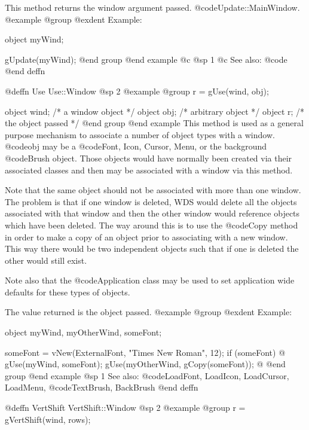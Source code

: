 This method returns the window argument passed.
@code{Update::MainWindow}.
@example
@group
@exdent Example:

object  myWind;

gUpdate(myWind);
@end group
@end example
@c @sp 1
@c See also:  @code{}
@end deffn









@deffn {Use} Use::Window
@sp 2
@example
@group
r = gUse(wind, obj);

object  wind;   /*  a window object     */
object  obj;    /*  arbitrary object    */
object  r;      /*  the object passed   */
@end group
@end example
This method is used as a general purpose mechanism to associate a
number of object types with a window.  @code{obj} may be a @code{Font,
Icon, Cursor, Menu,} or the background @code{Brush} object.  Those
objects would have normally been created via their associated classes
and then may be associated with a window via this method.

Note that the same object should not be associated with more than one
window.  The problem is that if one window is deleted, WDS would delete
all the objects associated with that window and then the other window
would reference objects which have been deleted.  The way around this is
to use the @code{Copy} method in order to make a copy of an object prior
to associating with a new window.  This way there would be two
independent objects such that if one is deleted the other would still
exist.

Note also that the @code{Application} class may be used to set application
wide defaults for these types of objects.

The value returned is the object passed.
@example
@group
@exdent Example:

object  myWind, myOtherWind, someFont;

someFont = vNew(ExternalFont, "Times New Roman", 12);
if (someFont)  @{
        gUse(myWind, someFont);
        gUse(myOtherWind, gCopy(someFont));
@}
@end group
@end example
@sp 1
See also:  @code{LoadFont, LoadIcon, LoadCursor, LoadMenu,}
        @code{TextBrush, BackBrush}
@end deffn








@deffn {VertShift} VertShift::Window
@sp 2
@example
@group
r = gVertShift(wind, rows);

